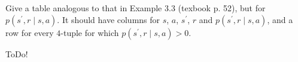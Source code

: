
\begin{exercise}[Exercise 3.4]

Give a table analogous to that in Example 3.3 (texbook p. 52), but for $p(s^\prime, r \mid s, a)$.
It should have columns for $s$, $a$, $s^\prime$, $r$ and $p(s^\prime, r \mid s, a)$, and a row for every $4$-tuple for which $p(s^\prime, r \mid s, a) > 0$.

\end{exercise}


\begin{solution}

ToDo!

\end{solution}


